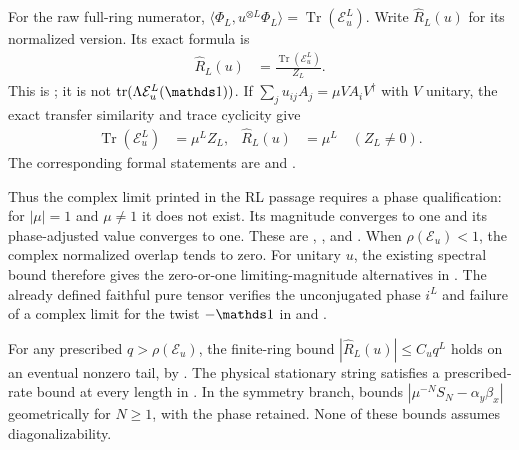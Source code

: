 \documentclass[11pt]{article}
\begin{document}
For the raw full-ring numerator,
$\langle\Phi_L,u^{\otimes L}\Phi_L\rangle=\operatorname{Tr}(\mathcal E_u^L)$.
Write $\widehat R_L(u)$ for its normalized version. Its exact formula is
\begin{align}
    \widehat R_L(u) & =\frac{\operatorname{Tr}(\mathcal E_u^L)}{Z_L}.
    \label{eq:pgwsvc08_periodic_full_ring}
\end{align}
This is
; it is not
$\tr(\Lambda\mathcal E_u^L(\Id))$. If
$\sum_j u_{ij}A_j=\mu V A_iV^\dagger$ with $V$ unitary, the exact transfer
similarity and trace cyclicity give
\begin{align}
    \operatorname{Tr}(\mathcal E_u^L)
     & =\mu^L Z_L,
     & \widehat R_L(u) & =\mu^L\quad(Z_L\ne0).
    \label{eq:pgwsvc08_periodic_full_phase}
\end{align}
The corresponding formal statements are
and .

Thus the complex limit printed in the RL passage requires a phase
qualification: for $|\mu|=1$ and $\mu\ne1$ it does not exist. Its magnitude
converges to one and its phase-adjusted value converges to one. These are
,
, and
.
When $\rho(\mathcal E_u)<1$, the complex normalized overlap tends to zero.
For unitary $u$, the existing spectral bound therefore gives the zero-or-one
limiting-magnitude alternatives in
.
The already defined faithful pure tensor verifies the unconjugated phase
$i^L$ and failure of a complex limit for the twist $-\Id$ in
 and
.

For any prescribed $q>\rho(\mathcal E_u)$, the finite-ring bound
$|\widehat R_L(u)|\leq C_uq^L$ holds on an eventual nonzero tail, by
.
The physical stationary string satisfies a prescribed-rate bound at every
length in .
In the symmetry branch,
bounds $|\mu^{-N}S_N-\alpha_y\beta_x|$ geometrically for $N\geq1$,
with the phase retained. None of these bounds assumes diagonalizability.
\end{document}
